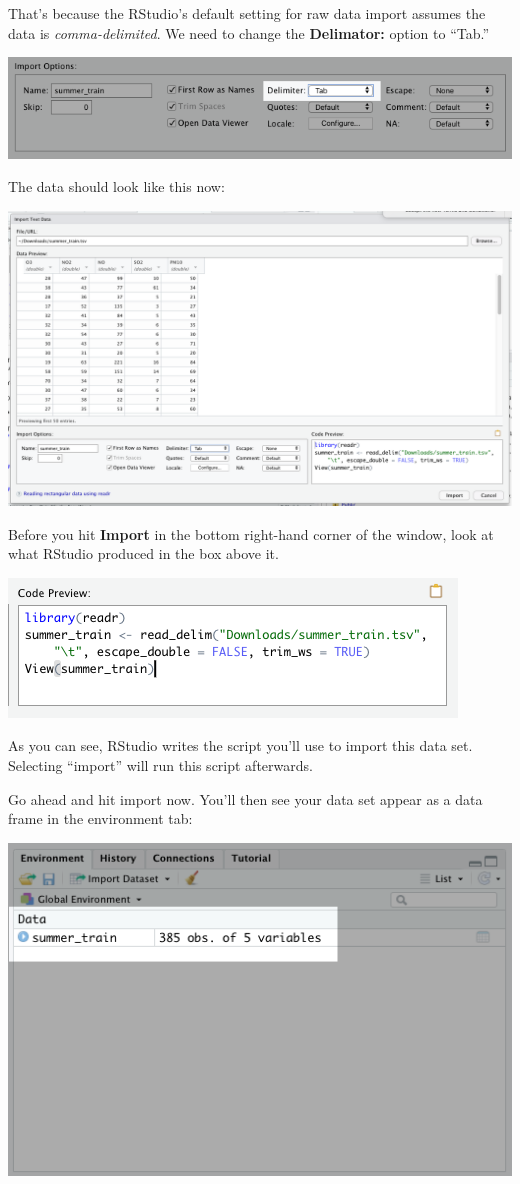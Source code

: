 \documentclass[
]{book}
\begin{document}
\begin{center}
That's because the RStudio's default setting for raw data import assumes the data is \emph{comma-delimited}. We need to change the \textbf{Delimator:} option to ``Tab.''

\begin{center}\includegraphics[width=0.75\linewidth]{1.61_Change_Tab} \end{center}

The data should look like this now:

\begin{center}\includegraphics[width=0.75\linewidth]{1.62_NonFunky_Data} \end{center}

Before you hit \textbf{Import} in the bottom right-hand corner of the window, look at what RStudio produced in the box above it.

\begin{center}\includegraphics[width=0.6\linewidth]{1.63_NewCode} \end{center}

As you can see, RStudio writes the script you'll use to import this data set. Selecting ``import'' will run this script afterwards.

Go ahead and hit import now. You'll then see your data set appear as a data frame in the environment tab:

\begin{center}\includegraphics[width=0.6\linewidth]{1.64_New_Data_Frame} \end{center}


\end{center}
\end{document}
